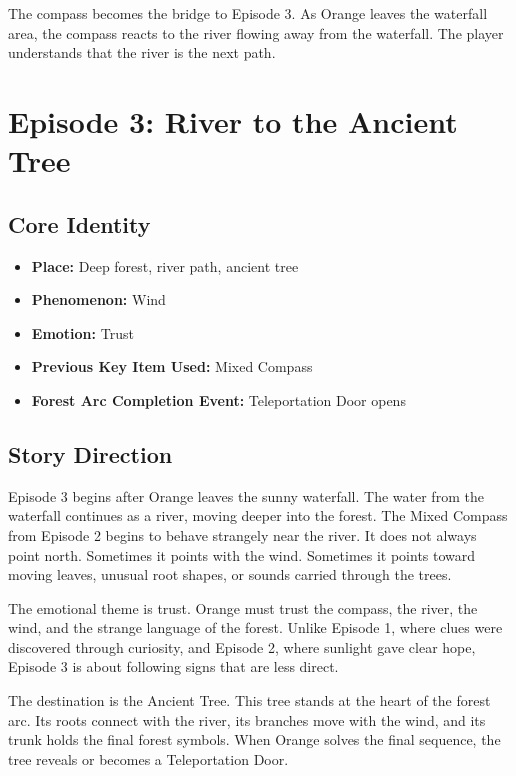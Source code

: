 \documentclass[12pt]{article}
\begin{document}
The compass becomes the bridge to Episode 3. As Orange leaves the waterfall area, the compass reacts to the river flowing away from the waterfall. The player understands that the river is the next path.

\section{Episode 3: River to the Ancient Tree}

\subsection{Core Identity}

\begin{itemize}[leftmargin=*]
    \item \textbf{Place:} Deep forest, river path, ancient tree
    \item \textbf{Phenomenon:} Wind
    \item \textbf{Emotion:} Trust
    \item \textbf{Previous Key Item Used:} Mixed Compass
    \item \textbf{Forest Arc Completion Event:} Teleportation Door opens
\end{itemize}

\subsection{Story Direction}

Episode 3 begins after Orange leaves the sunny waterfall. The water from the waterfall continues as a river, moving deeper into the forest. The Mixed Compass from Episode 2 begins to behave strangely near the river. It does not always point north. Sometimes it points with the wind. Sometimes it points toward moving leaves, unusual root shapes, or sounds carried through the trees.

The emotional theme is trust. Orange must trust the compass, the river, the wind, and the strange language of the forest. Unlike Episode 1, where clues were discovered through curiosity, and Episode 2, where sunlight gave clear hope, Episode 3 is about following signs that are less direct.

The destination is the Ancient Tree. This tree stands at the heart of the forest arc. Its roots connect with the river, its branches move with the wind, and its trunk holds the final forest symbols. When Orange solves the final sequence, the tree reveals or becomes a Teleportation Door.
\end{document}

